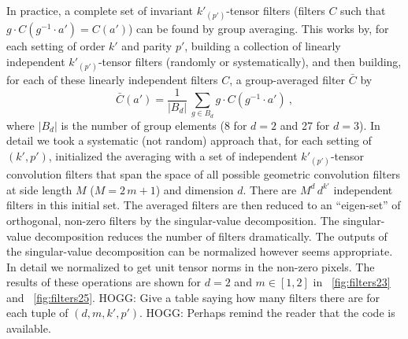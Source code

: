 \documentclass{article}
\theoremstyle{definition}
\newcommand{\tensorname}[2]{{#1}_{(#2)}}
\newcommand{\tensor}[2]{$\tensorname{#1}{#2}$-tensor}
\newcommand{\figref}[1]{\figurename~\ref{#1}}
\begin{document}
In practice, a complete set of invariant \tensor{k'}{p'} filters (filters $C$ such that $g\cdot C(g^{-1} \cdot a') = C(a')$) can be found by group averaging.
This works by, for each setting of order $k'$ and parity $p'$, building a collection of linearly independent \tensor{k'}{p'} filters (randomly or systematically), and then building, for each of these linearly independent filters $C$, a group-averaged filter $\bar{C}$ by
\begin{equation}
    \bar{C}(a') = \frac{1}{|B_d|}\,\sum_{g\in B_d} g\cdot C(g^{-1}\cdot a') ~,
\end{equation}
where $|B_d|$ is the number of group elements (8 for $d=2$ and 27 for $d=3$).
In detail we took a systematic (not random) approach that, for each setting of $(k',p')$, initialized the averaging with a set of independent \tensor{k'}{p'} convolution filters that span the space of all possible geometric convolution filters at side length $M$ ($M=2\,m+1$) and dimension $d$.
There are $M^d\,d^{k'}$ independent filters in this initial set.
The averaged filters are then reduced to an ``eigen-set'' of orthogonal, non-zero filters by the singular-value decomposition.
The singular-value decomposition reduces the number of filters dramatically.
The outputs of the singular-value decomposition can be normalized however seems appropriate.
In detail we normalized to get unit tensor norms in the non-zero pixels.
The results of these operations are shown for $d=2$ and $m\in[1, 2]$ in \figref{fig:filters23} and \figref{fig:filters25}.
HOGG: Give a table saying how many filters there are for each tuple of $(d,m,k',p')$.
HOGG: Perhaps remind the reader that the code is available.
\end{document}
